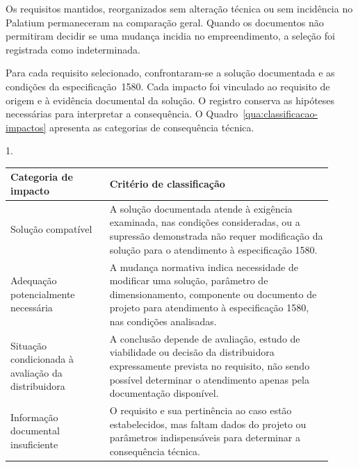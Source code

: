 \par\noindent
\begin{minipage}{\linewidth}
  \label{fig:selecao-requisitos}
  \vspace{0.7\baselineskip}
  {\centering\par}
\end{minipage}
\par

Os requisitos mantidos, reorganizados sem alteração técnica ou sem incidência no Palatium permaneceram na comparação geral. Quando os documentos não permitiram decidir se uma mudança incidia no empreendimento, a seleção foi registrada como indeterminada.

Para cada requisito selecionado, confrontaram-se a solução documentada e as condições da especificação~1580. Cada impacto foi vinculado ao requisito de origem e à evidência documental da solução. O registro conserva as hipóteses necessárias para interpretar a consequência. O Quadro~\ref{qua:classificacao-impactos} apresenta as categorias de consequência técnica.

\begin{quadro}[htbp]
  \centering
  \begin{Spacing}{1.}
    \caption{Classificação dos impactos técnicos no estudo de caso}
    \label{qua:classificacao-impactos}
  \end{Spacing}
  {\small
  \renewcommand{\arraystretch}{1.2}
  \setlength{\tabcolsep}{4pt}
  \begin{tabular}{|>{\raggedright\arraybackslash}p{0.29\linewidth}|>{\raggedright\arraybackslash}p{0.63\linewidth}|}
    \hline
    \textbf{Categoria de impacto} & \textbf{Critério de classificação} \\\hline
    Solução compatível & A solução documentada atende à exigência examinada, nas condições consideradas, ou a supressão demonstrada não requer modificação da solução para o atendimento à especificação 1580. \\\hline
    Adequação potencialmente necessária & A mudança normativa indica necessidade de modificar uma solução, parâmetro de dimensionamento, componente ou documento de projeto para atendimento à especificação 1580, nas condições analisadas. \\\hline
    Situação condicionada à avaliação da distribuidora & A conclusão depende de avaliação, estudo de viabilidade ou decisão da distribuidora expressamente prevista no requisito, não sendo possível determinar o atendimento apenas pela documentação disponível. \\\hline
    Informação documental insuficiente & O requisito e sua pertinência ao caso estão estabelecidos, mas faltam dados do projeto ou parâmetros indispensáveis para determinar a consequência técnica. \\\hline
  \end{tabular}}
\end{quadro}


